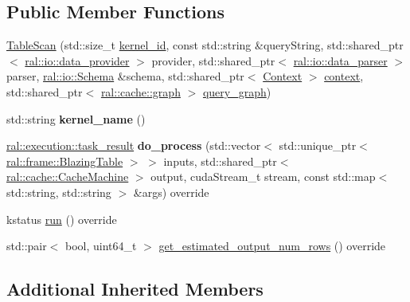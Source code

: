 \subsection*{Public Member Functions}
\begin{DoxyCompactItemize}
\item 
\hyperlink{classral_1_1batch_1_1TableScan_a64b1e4afbf75881a69e4adb43a553e76}{Table\+Scan} (std\+::size\+\_\+t \hyperlink{classral_1_1cache_1_1kernel_a2fd708656cb056a41ec635b8bdc4acfe}{kernel\+\_\+id}, const std\+::string \&query\+String, std\+::shared\+\_\+ptr$<$ \hyperlink{classral_1_1io_1_1data__provider}{ral\+::io\+::data\+\_\+provider} $>$ provider, std\+::shared\+\_\+ptr$<$ \hyperlink{classral_1_1io_1_1data__parser}{ral\+::io\+::data\+\_\+parser} $>$ parser, \hyperlink{classral_1_1io_1_1Schema}{ral\+::io\+::\+Schema} \&schema, std\+::shared\+\_\+ptr$<$ \hyperlink{classblazingdb_1_1manager_1_1Context}{Context} $>$ \hyperlink{classral_1_1cache_1_1kernel_af0347d14d678cfa7205c1387746a2e1b}{context}, std\+::shared\+\_\+ptr$<$ \hyperlink{classral_1_1cache_1_1graph}{ral\+::cache\+::graph} $>$ \hyperlink{classral_1_1cache_1_1kernel_a5fbb02292aff165a28ef25e75f0d89bd}{query\+\_\+graph})
\item 
\mbox{\label{classral_1_1batch_1_1TableScan_aefff58b223d27036f10be1510b2bda3c}} 
std\+::string {\bfseries kernel\+\_\+name} ()
\item 
\mbox{\label{classral_1_1batch_1_1TableScan_a26d62bf60a042d1a1cc2ffa4ec38b51b}} 
\hyperlink{structral_1_1execution_1_1task__result}{ral\+::execution\+::task\+\_\+result} {\bfseries do\+\_\+process} (std\+::vector$<$ std\+::unique\+\_\+ptr$<$ \hyperlink{classral_1_1frame_1_1BlazingTable}{ral\+::frame\+::\+Blazing\+Table} $>$ $>$ inputs, std\+::shared\+\_\+ptr$<$ \hyperlink{classral_1_1cache_1_1CacheMachine}{ral\+::cache\+::\+Cache\+Machine} $>$ output, cuda\+Stream\+\_\+t stream, const std\+::map$<$ std\+::string, std\+::string $>$ \&args) override
\item 
kstatus \hyperlink{classral_1_1batch_1_1TableScan_a0dd1b7ffeaec582922ee586b452245c0}{run} () override
\item 
std\+::pair$<$ bool, uint64\+\_\+t $>$ \hyperlink{classral_1_1batch_1_1TableScan_a7e0bd59ce5ca3d44b0530927f5edd481}{get\+\_\+estimated\+\_\+output\+\_\+num\+\_\+rows} () override
\end{DoxyCompactItemize}
\subsection*{Additional Inherited Members}


